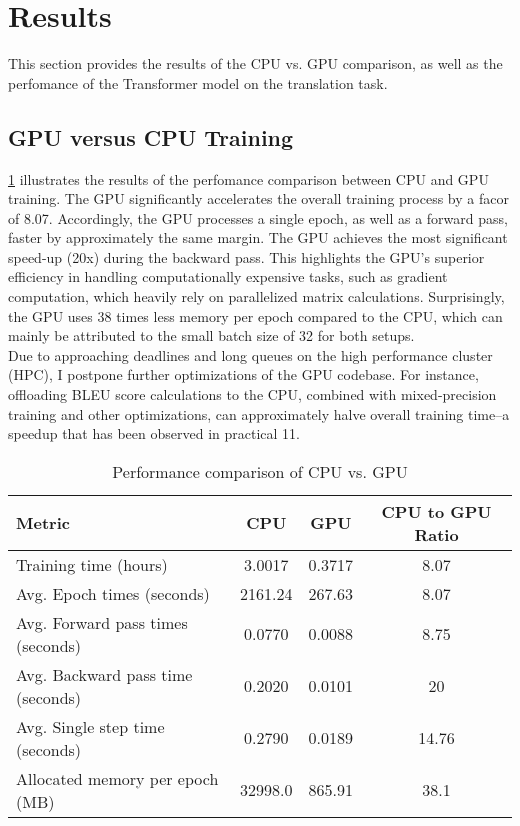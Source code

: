 \section{Results}\label{sec:results}

This section provides the results of the CPU vs. GPU comparison, as well as the perfomance of the Transformer model on the translation task.

\subsection{GPU versus CPU Training}

\cref{tab:comparison} illustrates the results of the perfomance comparison between CPU and GPU training.
The GPU significantly accelerates the overall training process by a facor of 8.07.
Accordingly, the GPU processes a single epoch, as well as a forward pass, faster by approximately the same margin.
The GPU achieves the most significant speed-up (20x) during the backward pass.
This highlights the GPU's superior efficiency in handling computationally expensive tasks, such as gradient computation, which heavily rely on parallelized matrix calculations.
Surprisingly, the GPU uses 38 times less memory per epoch compared to the CPU, which can mainly be attributed to the small batch size of 32 for both setups.\\
Due to approaching deadlines and long queues on the high performance cluster (HPC), I postpone further optimizations of the GPU codebase.
For instance, offloading BLEU score calculations to the CPU, combined with mixed-precision training and other optimizations, can approximately halve overall training time--a speedup that has been observed in practical 11.\\
\begin{table}[ht]
    \centering
    \begin{tabular}{lccc}
        \toprule
        \textbf{Metric} & \textbf{CPU} & \textbf{GPU} & \textbf{CPU to GPU Ratio} \\
        \midrule
        Training time (hours)       & 3.0017 & 0.3717 & 8.07 \\
        Avg. Epoch times (seconds)       & 2161.24 & 267.63 & 8.07 \\
        Avg. Forward pass times (seconds)& 0.0770 & 0.0088 & 8.75 \\
        Avg. Backward pass time (seconds)& 0.2020 & 0.0101 & 20 \\
        Avg. Single step time (seconds)  & 0.2790 & 0.0189 & 14.76  \\
        Allocated memory per epoch (MB)       & 32998.0  & 865.91 & 38.1 \\
        \bottomrule
    \end{tabular}
    \caption{Performance comparison of CPU vs. GPU}
    \label{tab:comparison}
\end{table}
